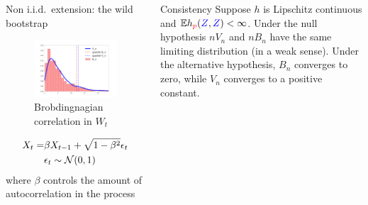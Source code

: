 \begin{frame}
\begin{columns}
\begin{column}{.33\linewidth}
\begin{block}{Non i.i.d.\ extension: the wild bootstrap}
 \begin{center}
  \begin{minipage}{.49\linewidth}
\begin{figure}
 \includegraphics[width=\textwidth]{../../presentation/img/bootstrapWorks7.pdf}
 \caption{Brobdingnagian correlation in $W_t$} 
\end{figure}
  \end{minipage}
\begin{minipage}{.49\linewidth}
\begin{align*}
 X_t =& \beta X_{t-1} + \sqrt{1 - \beta^2}\epsilon_t\\
 & \epsilon_t \sim {\cal N}(0,1)
\end{align*}
 where $\beta$ controls the amount of autocorrelation in the process
\end{minipage}
\end{center}

 
\end{block}
\end{column}


\hspace{-1.45cm}


\begin{column}{.32\linewidth}
\begin{block}{Consistency}
\large
 Suppose  $h$ is Lipschitz continuous and
$\mathbb{E} h_{{ \color{red} p}}({ \color{blue} Z},{ \color{blue} Z})<\infty$. Under the null hypothesis $nV_n$ and $nB_n$ have the same limiting distribution (in a weak sense). Under the alternative hypothesis,
$B_{n}$ converges to zero, while $V_{n}$ converges to a positive
constant.


\end{block}
\end{column}
\end{columns}
\end{frame}
